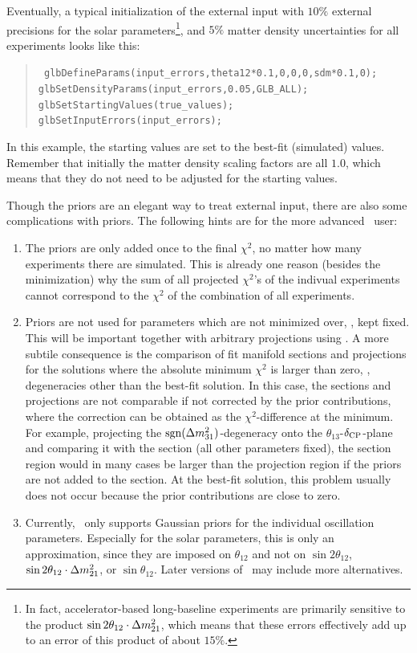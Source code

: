Eventually, a typical initialization of the external input with
$10\%$ external precisions for the solar parameters\footnote{In fact, accelerator-based long-baseline experiments are primarily sensitive to the product $\sin 2 \theta_{12} \cdot \Delta m_{21}^2$, which means that these errors effectively add up to an error of this product of about $15\%$.}, 
and $5\%$ matter density uncertainties for all experiments looks like this:
\begin{quote}
{\tt
 glbDefineParams(input\_errors,theta12*0.1,0,0,0,sdm*0.1,0);\\  
 glbSetDensityParams(input\_errors,0.05,GLB\_ALL);\\
 glbSetStartingValues(true\_values);\\
 glbSetInputErrors(input\_errors);\\
}
\end{quote}
In this example, the starting values are set to the best-fit (simulated) values. Remember that initially the matter density scaling factors are 
all $1.0$, which means that they do not need to be adjusted for the
starting values.

Though the priors are an elegant way to treat external input, there are also some complications with priors. The following hints are for the
more advanced \GLOBES\ user:
\begin{enumerate}
\item
 The priors are only added once to the final $\chi^2$, no matter how
 many experiments there are simulated. This is already one reason
 (besides the minimization) why the sum of all projected $\chi^2$'s of 
 the indivual experiments 
 cannot correspond to the $\chi^2$ of the combination of all experiments.
\item
 Priors are not used for parameters which are not minimized over, \ie, 
 kept fixed. This will be important together with arbitrary projections
 using . A more subtile consequence is the comparison
 of fit manifold sections and projections for the solutions where
 the absolute minimum $\chi^2$ is larger than zero, \ie, degeneracies
 other than the best-fit solution. In this case, the sections and
 projections are not  comparable if not corrected by the prior contributions, where the
 correction can be obtained as the $\chi^2$-difference at the minimum.
 For example, projecting the $\mathrm{sgn}(\Delta m_{31}^2)$-degeneracy onto
 the $\theta_{13}$-$\delta_{\mathrm{CP}}$-plane and comparing it with the section
 (all other parameters fixed), the section region would in many cases be 
 larger than the projection region if the priors are not added to the
 section. At the best-fit solution, this problem usually does not occur
 because the prior contributions are close to zero.    
\item
Currently, \GLOBES\ only supports Gaussian priors for the individual
oscillation parameters. Especially for the solar parameters, this is only
 an approximation, since they are imposed on $\theta_{12}$ and not
 on $\sin 2 \theta_{12}$, $\sin 2 \theta_{12} \cdot \Delta m_{21}^2$, or $\sin  
 \theta_{12}$. Later versions of  \GLOBES\ may include more alternatives.
 \end{enumerate}
 
